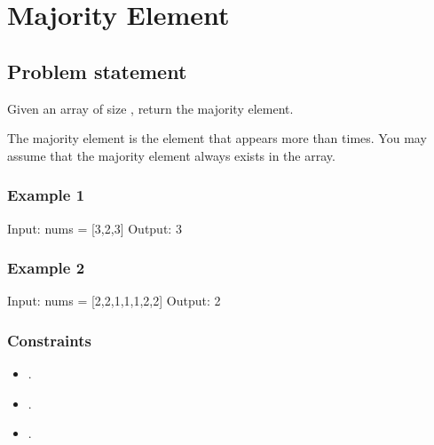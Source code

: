 \documentclass[letterpaper,12pt,english]{book}
\begin{document}
\sphinxstepscope


\section{Majority Element}
\label{\detokenize{Sorting/04_SORT_169_Majority_Element:majority-element}}\label{\detokenize{Sorting/04_SORT_169_Majority_Element::doc}}

\subsection{Problem statement\sphinxfootnotemark[78]}
\label{\detokenize{Sorting/04_SORT_169_Majority_Element:problem-statement}}%
\begin{footnotetext}[78]\sphinxAtStartFootnote
{}
%
\end{footnotetext}\ignorespaces 
\sphinxAtStartPar
Given an array  of size , return the majority element.

\sphinxAtStartPar
The majority element is the element that appears more than  times. You may assume that the majority element always exists in the array.


\subsubsection{Example 1}
\label{\detokenize{Sorting/04_SORT_169_Majority_Element:example-1}}
\begin{sphinxVerbatim}[commandchars=\\\{\}]
Input: nums = [3,2,3]
Output: 3
\end{sphinxVerbatim}


\subsubsection{Example 2}
\label{\detokenize{Sorting/04_SORT_169_Majority_Element:example-2}}
\begin{sphinxVerbatim}[commandchars=\\\{\}]
Input: nums = [2,2,1,1,1,2,2]
Output: 2
\end{sphinxVerbatim}


\subsubsection{Constraints}
\label{\detokenize{Sorting/04_SORT_169_Majority_Element:constraints}}\begin{itemize}
\item {} 
\sphinxAtStartPar
{}.

\item {} 
\sphinxAtStartPar
{}.

\item {} 
\sphinxAtStartPar
{}.

\end{itemize}
\end{document}
